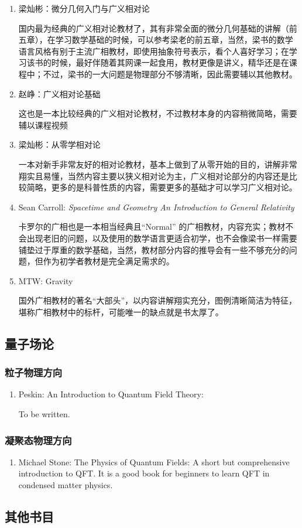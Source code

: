 \begin{enumerate}
  \item 梁灿彬：微分几何入门与广义相对论
  
  国内最为经典的广义相对论教材了，其有非常全面的微分几何基础的讲解（前五章），在学习数学基础的时候，可以参考梁老的前五章，当然，梁书的数学语言风格有别于主流广相教材，即使用抽象符号表示，看个人喜好学习；在学习该书的时候，最好伴随着其网课一起食用，教材更像是讲义，精华还是在课程中；不过，梁书的一大问题是物理部分不够清晰，因此需要辅以其他教材。
  \item 赵峥：广义相对论基础
  
  这也是一本比较经典的广义相对论教材，不过教材本身的内容稍微简略，需要辅以课程视频
  \item 梁灿彬：从零学相对论
  
  一本对新手非常友好的相对论教材，基本上做到了从零开始的目的，讲解非常翔实且易懂，当然内容主要以狭义相对论为主，广义相对论部分的内容还是比较简略，更多的是科普性质的内容，需要更多的基础才可以学习广义相对论。
  \item Sean Carroll: \textit{Spacetime and Geometry An Introduction to General Relativity}
  
  卡罗尔的广相也是一本相当经典且“Normal” 的广相教材，内容充实；教材不会出现老旧的问题，以及使用的数学语言更适合初学，也不会像梁书一样需要铺垫过于厚重的数学基础，当然，教材部分内容的推导会有一些不够充分的问题，但作为初学者教材是完全满足需求的。
  \item MTW: Gravity
  
  国外广相教材的著名“大部头”，以内容讲解翔实充分，图例清晰简洁为特征，堪称广相教材中的标杆，可能唯一的缺点就是书太厚了。
\end{enumerate}


\subsection*{量子场论}
\subsubsection*{粒子物理方向}
\begin{enumerate}
  \item Peskin: An Introduction to Quantum Field Theory:

  To be written.
\end{enumerate}

\subsubsection*{凝聚态物理方向}
\begin{enumerate}
  \item Michael Stone: The Physics of Quantum Fields:
  A short but comprehensive introduction to QFT. It is a good book for beginners to learn QFT in condensed matter physics.
\end{enumerate}

\subsection*{其他书目}




